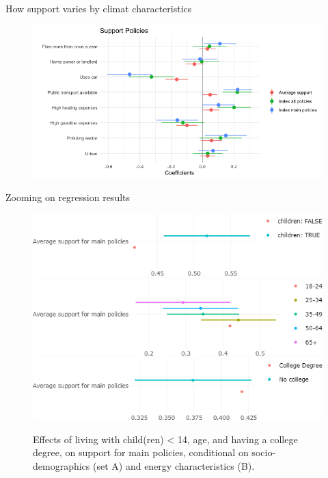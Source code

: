\begin{framefont}{\small}
\begin{frame}{How support varies by climat characteristics}
\begin{figure}
	\includegraphics[width=.9\paperwidth]{../figures/FR/reg_support_policies_AB_FR.png}
\end{figure}
\end{frame}


\begin{frame}{Zooming on regression results}
\begin{figure}[h!]	
	\caption{Effects of living with child(ren) < 14, age, and having a college degree, on support for main policies, conditional on socio-demographics (set A) and energy characteristics (B).}
	\includegraphics[width=.7\textwidth]{../figures/FR/policies_support_by_children.png}
	\includegraphics[width=.7\textwidth]{../figures/FR/policies_support_by_age.png}
	\includegraphics[width=.7\textwidth]{../figures/FR/policies_support_by_college.png}
\end{figure}
\end{frame}


\end{framefont}
